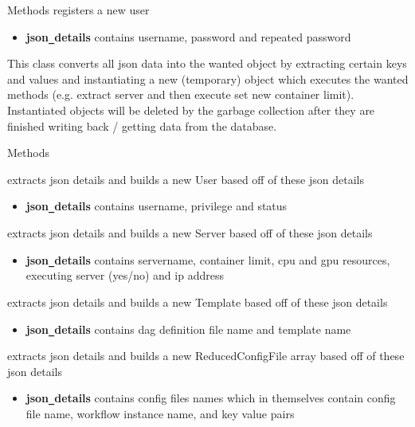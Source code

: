 \begin{methodenv}{Methods}
registers a new user
\begin{itemize}
        \item \textbf{json\texttt{\_}details}
        contains username, password and repeated password
\end{itemize}

\end{methodenv}

This class converts all json data into the wanted object by extracting certain keys and values and instantiating
a new (temporary) object which executes the wanted methods (e.g. extract server and then execute set new container limit).
Instantiated objects will be deleted by the garbage collection after they are finished writing back / getting data
from the database.

\begin{methodenv}{Methods}

extracts json details and builds a new User based off of these json details
\begin{itemize}
        \item \textbf{json\texttt{\_}details}
        contains username, privilege and status
\end{itemize}

extracts json details and builds a new Server based off of these json details
\begin{itemize}
        \item \textbf{json\texttt{\_}details}
        contains servername, container limit, cpu and gpu resources, executing server (yes/no) and ip address
\end{itemize}

extracts json details and builds a new Template based off of these json details
\begin{itemize}
        \item \textbf{json\texttt{\_}details}
        contains dag definition file name and template name
\end{itemize}

extracts json details and builds a new ReducedConfigFile array based off of these json details
\begin{itemize}
        \item \textbf{json\texttt{\_}details}
        contains config files names which in themselves contain config file name, workflow instance name,
        and key value pairs
\end{itemize}

\end{methodenv}

